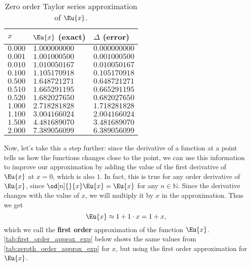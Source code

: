 \begin{table}
	\caption{Zero order Taylor series approximation of $\Eu{x}$.}
	\label{tab:zeroth_order_approx_exp}
	\begin{center}
		{
			\renewcommand{\arraystretch}{1.2}
			\begin{tabular}[c]{lll}
				\toprule
				$x$     & $\Eu{x}$ (exact) & $\Delta$ (error) \\
				\midrule
				$0.000$ & $1.000000000$    & $0.000000000$    \\
				$0.001$ & $1.001000500$    & $0.001000500$    \\
				$0.010$ & $1.010050167$    & $0.010050167$    \\
				$0.100$ & $1.105170918$    & $0.105170918$    \\
				$0.500$ & $1.648721271$    & $0.648721271$    \\
				$0.510$ & $1.665291195$    & $0.665291195$    \\
				$0.520$ & $1.682027650$    & $0.682027650$    \\
				$1.000$ & $2.718281828$    & $1.718281828$    \\
				$1.100$ & $3.004166024$    & $2.004166024$    \\
				$1.500$ & $4.481689070$    & $3.481689070$    \\
				$2.000$ & $7.389056099$    & $6.389056099$    \\
				\bottomrule
			\end{tabular}
		}
	\end{center}
\end{table}

Now, let's take this a step further: since the derivative of a function at a point tells us how the functions changes close to the point, we can use this information to improve our approximation by adding the value of the first derivative of $\Eu{x}$ at $x=0$, which is also $1$. In fact, this is true for any order derivative of $\Eu{x}$, since $\od[n]{}{x}\Eu{x}=\Eu{x}$ for any $n\in\mathbb{N}$. Since the derivative changes with the value of $x$, we will multiply it by $x$ in the approximation. Thus we get
\begin{equation}
	\Eu{x} \approx 1 + 1\cdot x = 1+x,
	\label{eq:first_order_approx_exp}
\end{equation}
which we call the \textbf{first order} approximation of the function $\Eu{x}$. \autoref{tab:first_order_approx_exp} below shows the same values from \autoref{tab:zeroth_order_approx_exp} for $x$, but using the first order approximation for $\Eu{x}$.

